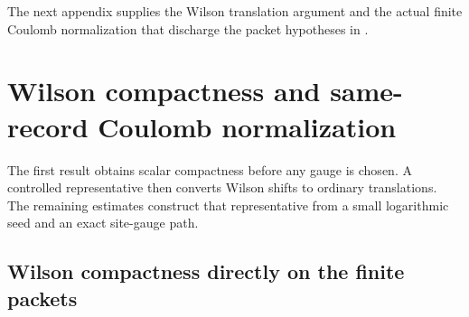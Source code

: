 \documentclass[11pt]{article}
\numberwithin{equation}{section}
\theoremstyle{definition}
\theoremstyle{remark}
\begin{document}
The next appendix supplies the Wilson translation argument and the actual
finite Coulomb normalization that discharge the packet hypotheses in
.

\section{Wilson compactness and same-record Coulomb normalization}
\label{app:finite-gauge-normalization}

The first result obtains scalar compactness before any gauge is chosen.
A controlled representative then converts Wilson shifts to ordinary
translations. The remaining estimates construct that representative from
a small logarithmic seed and an exact site-gauge path.

\subsection{Wilson compactness directly on the finite packets}
\end{document}
